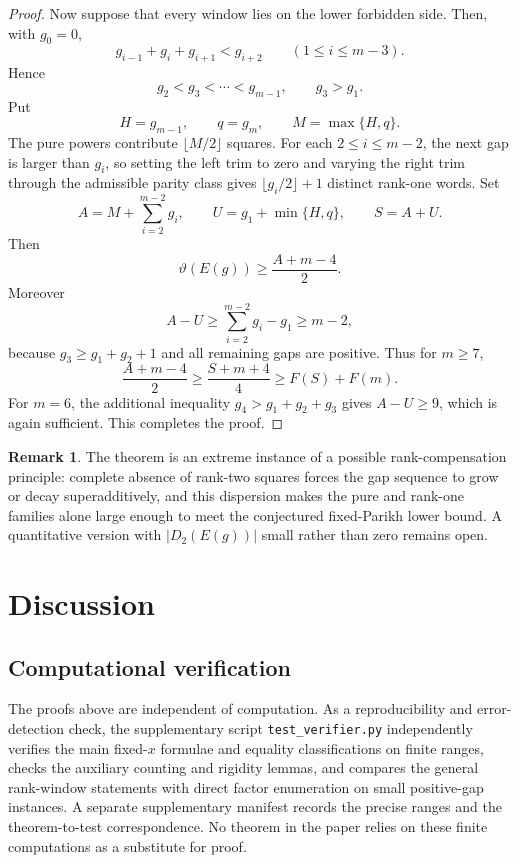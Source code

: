 \documentclass[11pt]{article}
\theoremstyle{definition}
\newtheorem{remark}[theorem]{Remark}
\newcommand{\thetaas}{\vartheta}
\begin{document}
\begin{proof}
Now suppose that every window lies on the lower forbidden side.  Then, with $g_0=0$,
\begin{equation}\label{eq:rank2-asc}
 g_{i-1}+g_i+g_{i+1}<g_{i+2}
 \qquad(1\le i\le m-3).
\end{equation}
Hence
\[
 g_2<g_3<\cdots<g_{m-1},
 \qquad g_3>g_1.
\]
Put
\[
 H=g_{m-1},\qquad q=g_m,\qquad M=\max\{H,q\}.
\]
The pure powers contribute $\lfloor M/2\rfloor$ squares.  For each $2\le i\le m-2$, the next gap is larger than $g_i$, so setting the left trim to zero and varying the right trim through the admissible parity class gives $\lfloor g_i/2\rfloor+1$ distinct rank-one words.  Set
\[
 A=M+\sum_{i=2}^{m-2}g_i,
 \qquad
 U=g_1+\min\{H,q\},
 \qquad
 S=A+U.
\]
Then
\[
 \thetaas(E(g))\ge\frac{A+m-4}{2}.
\]
Moreover
\[
 A-U\ge\sum_{i=2}^{m-2}g_i-g_1\ge m-2,
\]
because $g_3\ge g_1+g_2+1$ and all remaining gaps are positive.  Thus for $m\ge7$,
\[
 \frac{A+m-4}{2}
 \ge\frac{S+m+4}{4}
 \ge F(S)+F(m).
\]
For $m=6$, the additional inequality $g_4>g_1+g_2+g_3$ gives $A-U\ge9$, which is again sufficient.  This completes the proof.
\end{proof}

\begin{remark}
The theorem is an extreme instance of a possible rank-compensation principle: complete absence of rank-two squares forces the gap sequence to grow or decay superadditively, and this dispersion makes the pure and rank-one families alone large enough to meet the conjectured fixed-Parikh lower bound.  A quantitative version with $|D_2(E(g))|$ small rather than zero remains open.
\end{remark}

\section{Discussion}

\subsection*{Computational verification}
The proofs above are independent of computation.  As a reproducibility and error-detection check, the supplementary script \texttt{test\_verifier.py} independently verifies the main fixed-$x$ formulae and equality classifications on finite ranges, checks the auxiliary counting and rigidity lemmas, and compares the general rank-window statements with direct factor enumeration on small positive-gap instances.  A separate supplementary manifest records the precise ranges and the theorem-to-test correspondence.  No theorem in the paper relies on these finite computations as a substitute for proof.
\end{document}

